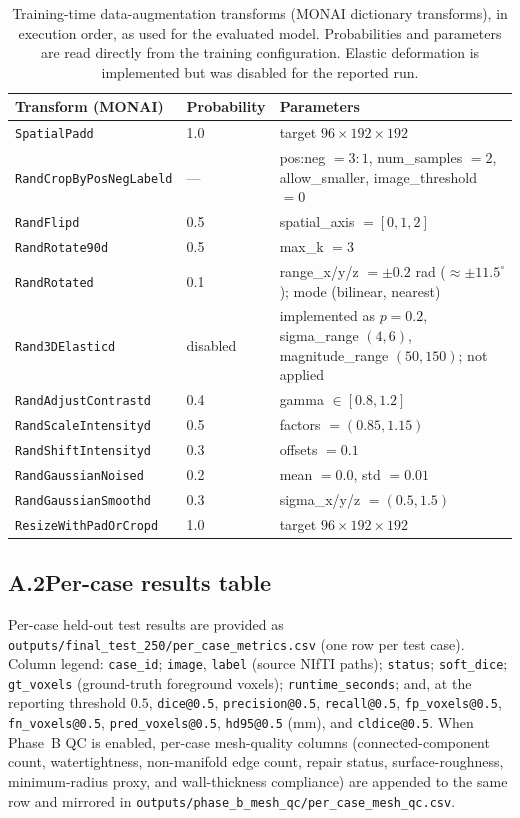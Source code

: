 \documentclass[anonymous]{iopjournal}
\begin{document}
\begin{table}[!t]
\centering
\caption{Training-time data-augmentation transforms (MONAI dictionary transforms), in execution order, as used for the evaluated model. Probabilities and parameters are read directly from the training configuration. Elastic deformation is implemented but was disabled for the reported run.}
\label{tab:aug}
\small
\begin{tabular}{@{}lll@{}}
\hline
Transform (MONAI) & Probability & Parameters \\
\hline
\texttt{SpatialPadd} & 1.0 & target $96\times192\times192$ \\
\texttt{RandCropByPosNegLabeld} & --- & pos:neg $=3{:}1$, num\_samples $=2$, allow\_smaller, image\_threshold $=0$ \\
\texttt{RandFlipd} & 0.5 & spatial\_axis $=[0,1,2]$ \\
\texttt{RandRotate90d} & 0.5 & max\_k $=3$ \\
\texttt{RandRotated} & 0.1 & range\_x/y/z $=\pm0.2$ rad ($\approx\pm11.5^\circ$); mode (bilinear, nearest) \\
\texttt{Rand3DElasticd} & disabled & implemented as $p=0.2$, sigma\_range $(4,6)$, magnitude\_range $(50,150)$; not applied \\
\texttt{RandAdjustContrastd} & 0.4 & gamma $\in[0.8,1.2]$ \\
\texttt{RandScaleIntensityd} & 0.5 & factors $=(0.85,1.15)$ \\
\texttt{RandShiftIntensityd} & 0.3 & offsets $=0.1$ \\
\texttt{RandGaussianNoised} & 0.2 & mean $=0.0$, std $=0.01$ \\
\texttt{RandGaussianSmoothd} & 0.3 & sigma\_x/y/z $=(0.5,1.5)$ \\
\texttt{ResizeWithPadOrCropd} & 1.0 & target $96\times192\times192$ \\
\hline
\end{tabular}
\end{table}

\subsection*{A.2\quad Per-case results table}

Per-case held-out test results are provided as \texttt{outputs/final\_test\_250/per\_case\_metrics.csv} (one row per test case). Column legend: \texttt{case\_id}; \texttt{image}, \texttt{label} (source NIfTI paths); \texttt{status}; \texttt{soft\_dice}; \texttt{gt\_voxels} (ground-truth foreground voxels); \texttt{runtime\_seconds}; and, at the reporting threshold $0.5$, \texttt{dice@0.5}, \texttt{precision@0.5}, \texttt{recall@0.5}, \texttt{fp\_voxels@0.5}, \texttt{fn\_voxels@0.5}, \texttt{pred\_voxels@0.5}, \texttt{hd95@0.5} (mm), and \texttt{cldice@0.5}. When Phase~B QC is enabled, per-case mesh-quality columns (connected-component count, watertightness, non-manifold edge count, repair status, surface-roughness, minimum-radius proxy, and wall-thickness compliance) are appended to the same row and mirrored in \texttt{outputs/phase\_b\_mesh\_qc/per\_case\_mesh\_qc.csv}.
\end{document}
